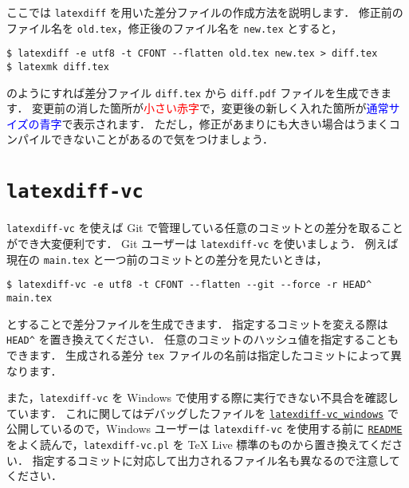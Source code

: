 ここでは \verb|latexdiff| を用いた差分ファイルの作成方法を説明します．
修正前のファイル名を \verb|old.tex|，修正後のファイル名を \verb|new.tex| とすると，
\begin{tcolorbox}[title={\texttt{latexdiff} を使用した差分ファイルの生成方法}]
\begin{verbatim}
$ latexdiff -e utf8 -t CFONT --flatten old.tex new.tex > diff.tex
$ latexmk diff.tex
\end{verbatim}
\end{tcolorbox}
\noindent
のようにすれば差分ファイル \verb|diff.tex| から \verb|diff.pdf| ファイルを生成できます．
変更前の消した箇所が\textcolor{red}{\scriptsize 小さい赤字}で，変更後の新しく入れた箇所が\textcolor{blue}{\sffamily 通常サイズの青字}で表示されます．
ただし，修正があまりにも大きい場合はうまくコンパイルできないことがあるので気をつけましょう．

\section{\texttt{latexdiff-vc}}
\label{sec:latexdiff-vc}

\verb|latexdiff-vc| を使えば Git で管理している任意のコミットとの差分を取ることができ大変便利です．
Git ユーザーは \verb|latexdiff-vc| を使いましょう．
例えば現在の \verb|main.tex| と一つ前のコミットとの差分を見たいときは，
\begin{tcolorbox}[title={\texttt{latexdiff-vc} を使用した差分ファイルの生成方法}]
\begin{verbatim}
$ latexdiff-vc -e utf8 -t CFONT --flatten --git --force -r HEAD^ main.tex
\end{verbatim}
\end{tcolorbox}
\noindent
とすることで差分ファイルを生成できます．
指定するコミットを変える際は \verb|HEAD^| を置き換えてください．
任意のコミットのハッシュ値を指定することもできます．
生成される差分 \verb|tex| ファイルの名前は指定したコミットによって異なります．

また，\verb|latexdiff-vc| を Windows で使用する際に実行できない不具合を確認しています．
これに関してはデバッグしたファイルを \href{https://github.com/Yuki-MATSUKAWA/latexdiff-vc_windows}{\texttt{latexdiff-vc\_windows}} で公開しているので，Windows ユーザーは \verb|latexdiff-vc| を使用する前に \href{https://github.com/Yuki-MATSUKAWA/latexdiff-vc_windows?tab=readme-ov-file#readme}{\texttt{README}} をよく読んで，\verb|latexdiff-vc.pl| を TeX Live 標準のものから置き換えてください．
指定するコミットに対応して出力されるファイル名も異なるので注意してください．



